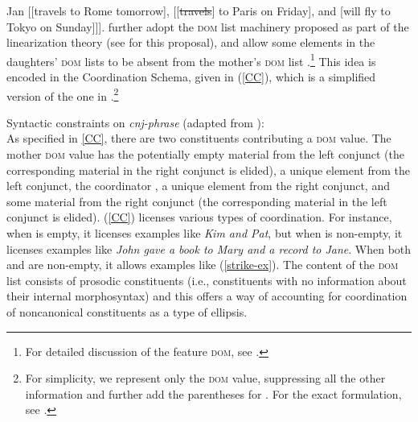 \eanoraggedright
\label{strike-ex}
 Jan [[travels to Rome tomorrow], [[\sout{travels}] to Paris on Friday], and [will fly to Tokyo on Sunday]]].
\z 
%
\citet{Beavers2004} further adopt the \textsc{dom} list
machinery proposed as part of the linearization theory (see  \citealt{Crysmann2003a} for this proposal), and
allow some elements in the daughters' \textsc{dom} lists to be absent from 
the mother's \textsc{dom} list \citep{Yatabe2001,Crysmann2003a}.\footnote{For detailed discussion of the feature \textsc{dom}, see .} 
%
%
This idea is encoded in the Coordination Schema, given in (\ref{CC}), which is a simplified
version of the one in \citep[27]{Beavers2004}.\footnote{For simplicity, we represent only the \textsc{dom} value, suppressing all the other information and further add the parentheses for . 
For the exact formulation, see \citet{Beavers2004}.}
%

\eanoraggedright\label{CC}
Syntactic constraints on \emph{cnj-phrase} (adapted from \citealt[27]{Beavers2004}):\\
 \impl
{}
\z
%
%
%
%
As specified in \ref{CC}, there are two constituents contributing a \textsc{dom} value.
The mother \textsc{dom} value has the potentially empty material  from the left conjunct (the corresponding material in the right conjunct is elided), a unique element  from the left
conjunct, the coordinator , a unique element  from
the right conjunct, and some material  from the right 
conjunct (the corresponding material in the left conjunct is elided). (\ref{CC}) licenses various types of coordination. For instance, 
when  is empty, it licenses examples like
\emph{Kim and Pat}, but when  is non-empty, it licenses examples like \emph{John gave a book to Mary and a record
to Jane}. %
When
both  and  are non-empty, it allows examples 
like (\ref{strike-ex}). The content of the \textsc{dom} list consists of prosodic constituents (i.e., constituents with no information about their internal morphosyntax) and this offers a way of accounting for coordination of noncanonical constituents as a type of ellipsis.
 
